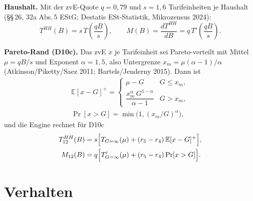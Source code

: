 \textbf{Haushalt.} Mit der zvE-Quote $q=0{,}79$ und $s=1{,}6$ Tarifeinheiten je Haushalt
(§§\,26, 32a Abs.\,5 EStG; Destatis ESt-Statistik, Mikrozensus 2024):
\begin{equation}
T^{HH}(B)=s\,T\!\left(\frac{qB}{s}\right),\qquad M(B)=\frac{dT^{HH}}{dB}=q\,T'\!\left(\frac{qB}{s}\right).
\end{equation}

\textbf{Pareto-Rand (D10c).} Das zvE $x$ je Tarifeinheit sei Pareto-verteilt mit Mittel
$\mu=qB/s$ und Exponent $\alpha=1{,}5$, also Untergrenze $x_m=\mu(\alpha-1)/\alpha$
(Atkinson/Piketty/Saez 2011; Bartels/Jenderny 2015). Dann ist
\begin{gather}
\mathbb E[x-G]^+=\begin{cases}\mu-G & G\le x_m,\\[2pt] \dfrac{x_m^{\alpha}\,G^{1-\alpha}}{\alpha-1} & G>x_m,\end{cases}\\
\Pr[x>G]=\min\bigl(1,(x_m/G)^\alpha\bigr),
\end{gather}
und die Engine rechnet für D10c
\begin{align}
T^{HH}_{12}(B)&=s\Bigl[T_{G=\infty}(\mu)+(r_5-r_4)\,\mathbb E[x-G]^+\Bigr],\\
M_{12}(B)&=q\Bigl[T'_{G=\infty}(\mu)+(r_5-r_4)\Pr[x>G]\Bigr].
\end{align}

\section{Verhalten}

